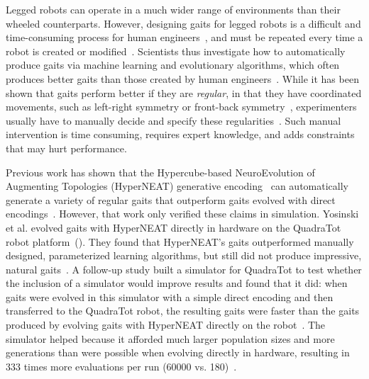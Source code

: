 
Legged robots can operate in a much wider range of environments than their wheeled counterparts. However, designing gaits for legged robots is a difficult and time-consuming process for human engineers~\cite{strom1999legged,wettergreen1992gait}, and must be repeated every time a robot is created or modified~\cite{hornby2005autonomous}. 
Scientists thus investigate how to automatically produce gaits via machine learning and evolutionary algorithms, which often produces better gaits than those created by human engineers~\cite{valsalam:mii,kohl:stone,hornby2005autonomous,hornby2003generative,yos:clune}. While it has been shown that gaits perform better if they are \emph{regular}, in that they have coordinated movements, such as left-right symmetry or front-back symmetry~\cite{valsalam:mii,clune2011performance,clune2009evolving,clune2009sensitivity}, experimenters usually have to manually decide and specify these regularities~\cite{valsalam:mii,tellez,beer,raibert}. 
Such manual intervention is time consuming, requires expert knowledge, and adds constraints that may hurt performance. 

Previous work has shown that the Hypercube-based NeuroEvolution of Augmenting Topologies (HyperNEAT) generative encoding~\cite{stanley2009hypercube} can automatically generate a variety of regular gaits that outperform gaits evolved with direct encodings~\cite{clune2009evolving,clune2011performance}.
However, that work only verified these claims in simulation. 
Yosinski et al. evolved gaits with HyperNEAT directly in hardware on the QuadraTot robot platform~(). They found that HyperNEAT's gaits outperformed manually designed, parameterized learning algorithms, but still did not produce impressive, natural gaits~\cite{yos:clune}. 
A follow-up study built a simulator for QuadraTot to test whether the inclusion of a simulator would improve results and found that it did:  when gaits were evolved in this simulator with a simple direct encoding and then transferred to the QuadraTot robot, the resulting gaits were faster than the gaits produced by evolving gaits with HyperNEAT directly on the robot~\cite{glette}. 
The simulator helped because it afforded much larger population sizes and more generations than were possible when evolving directly in hardware, resulting in 333 times more evaluations per run (60000 vs. 180)~\cite{yos:clune,glette}. 


